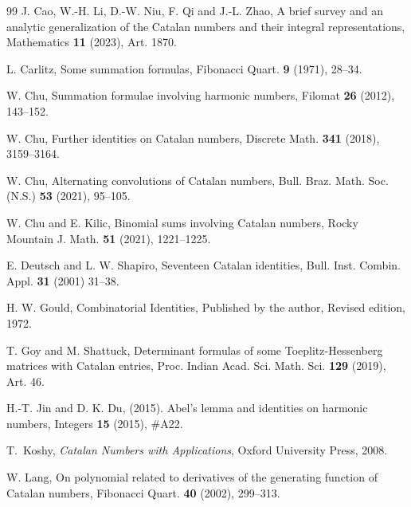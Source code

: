 \documentclass[12pt,reqno]{article}
\begin{document}
\begin{thebibliography}{99}
\vspace{-1pt}
J. Cao, W.-H. Li, D.-W. Niu, F. Qi and J.-L. Zhao, A brief survey and an analytic generalization of the Catalan numbers and their integral
representations, Mathematics \textbf{11} (2023), Art. 1870.

\vspace{-1pt}
L. Carlitz, Some summation formulas, Fibonacci Quart. {\bf 9} (1971), 28--34.

\vspace{-1pt}
W. Chu, Summation formulae involving harmonic numbers, Filomat {\bf 26} (2012), 143--152.

\vspace{-1pt}
W. Chu, Further identities on Catalan numbers, Discrete Math. {\bf 341} (2018), 3159--3164.

\vspace{-1pt}
W. Chu, Alternating convolutions of Catalan numbers, Bull. Braz. Math. Soc. (N.S.) {\bf 53} (2021), 95--105.

\vspace{-1pt}
W. Chu and E. Kilic, Binomial sums involving Catalan numbers, Rocky Mountain J. Math. {\bf 51} (2021), 1221--1225.

\vspace{-1pt}
E. Deutsch and L. W. Shapiro, Seventeen Catalan identities, Bull. Inst. Combin. Appl. {\bf 31} (2001) 31--38.

\vspace{-1pt}
H. W. Gould, Combinatorial Identities, Published by the author, Revised edition, 1972.

\vspace{-1pt}
T. Goy and M. Shattuck, Determinant formulas of some Toeplitz-Hessenberg matrices with Catalan entries, Proc. Indian Acad. Sci. Math. Sci. \textbf{129} (2019), Art. 46.

\vspace{-1pt}
H.-T. Jin and D. K. Du, (2015). Abel's lemma and identities on harmonic numbers, Integers {\bf 15} (2015), \#A22.

\vspace{-1pt}
T.~Koshy, \emph{Catalan Numbers with Applications}, Oxford University Press, 2008.

\vspace{-1pt}
W. Lang, On polynomial related to derivatives of the generating function of Catalan numbers, Fibonacci Quart. \textbf{40} (2002), 299--313.


\end{thebibliography}
\end{document}
